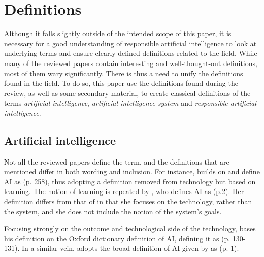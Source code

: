 \section{Definitions}
\label{sec:Definitions}
Although it falls slightly outside of the intended scope of this paper, it is necessary for a good understanding of responsible artificial intelligence to look at underlying terms and ensure clearly defined definitions related to the field. While many of the reviewed papers contain interesting and well-thought-out definitions, most of them wary significantly. There is thus a need to unify the definitions found in the field. To do so, this paper use the definitions found during the review, as well as some secondary material, to create classical definitions \parencite[p. 36]{Seppälä_2014} of the terms \textit{artificial intelligence}, \textit{artificial intelligence system} and \textit{responsible artificial intelligence}.


\subsection{Artificial intelligence}
\label{sec:definition-ai}
Not all the reviewed papers define the term, and the definitions that are mentioned differ in both wording and inclusion. For instance,
\textcite{Mikalef_2022} builds on \textcite{Mikalef_2021} and define AI as  (p. 258), thus adopting a definition removed from technology but based on learning. The notion of learning is repeated by \textcite{Dignum_2021}, who defines AI as  (p.2). Her definition differs from that of \citeauthor{Mikalef_2022} in that she focuses on the technology, rather than the system, and she does not include the notion of the system's goals.

Focusing strongly on the outcome and technological side of the technology, \textcite{Brand_2022} bases his definition on the Oxford dictionary definition of AI, defining it as  (p. 130-131). In a similar vein, \textcite{Havrda_2020} adopts the broad definition of AI given by \textcite{IEEE_vision} as  (p. 1).

